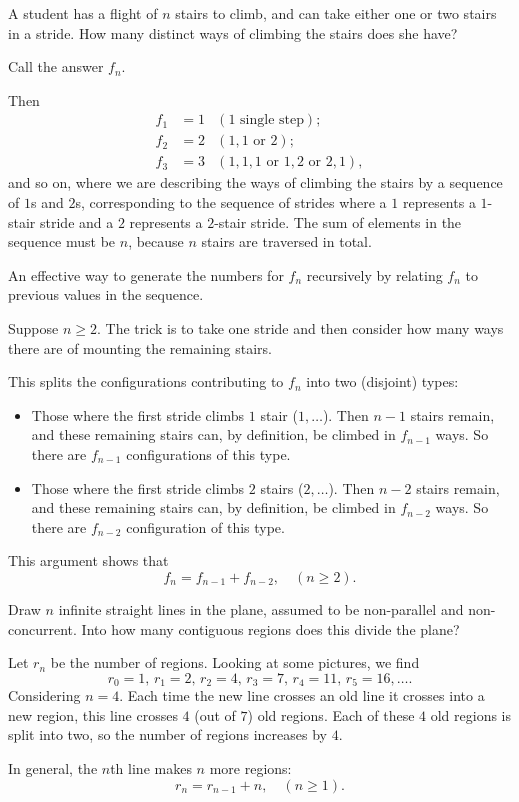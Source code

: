 \documentclass[10pt, a4paper]{article}
\begin{document}
\begin{example}[H1]
    A student has a flight of $n$ stairs to climb,
    and can take either one or two stairs in a stride.
    How many distinct ways of climbing the stairs does she have?

    Call the answer $f_n$.

    Then
    \begin{align*}
        f_1 &= 1 &(1 \text{ single step}); \\
        f_2 &= 2 &(1, 1 \text{ or } 2); \\
        f_3 &= 3 &(1, 1, 1 \text{ or } 1, 2 \text{ or } 2, 1),
    \end{align*}
    and so on,
    where we are describing the ways of climbing the stairs by a sequence of $1$s and $2$s,
    corresponding to the sequence of strides where a $1$ represents a $1$-stair stride and a $2$ represents a $2$-stair stride.
    The sum of elements in the sequence must be $n$,
    because $n$ stairs are traversed in total.

    An effective way to generate the numbers for $f_n$ recursively by relating $f_n$ to previous values in the sequence.

    Suppose $n \geq 2$.
    The trick is to take one stride and then consider how many ways there are of mounting the remaining stairs.

    This splits the configurations contributing to $f_n$ into two (disjoint) types:
    \begin{itemize}
        \item Those where the first stride climbs $1$ stair ($1, \dotsc$).
        Then $n - 1$ stairs remain,
        and these remaining stairs can, by definition,
        be climbed in $f_{n - 1}$ ways.
        So there are $f_{n - 1}$ configurations of this type.
        \item Those where the first stride climbs $2$ stairs ($2, \dotsc$).
        Then $n - 2$ stairs remain,
        and these remaining stairs can, by definition,
        be climbed in $f_{n - 2}$ ways.
        So there are $f_{n - 2}$ configuration of this type.
    \end{itemize}
    This argument shows that
    \[
    f_n = f_{n - 1} + f_{n - 2},\quad(n \geq 2).
    \]
\end{example}

\begin{example}[H2]
    Draw $n$ infinite straight lines in the plane,
    assumed to be non-parallel and non-concurrent.
    Into how many contiguous regions does this divide the plane?

    Let $r_n$ be the number of regions.
    Looking at some pictures, we find
    \[
    r_0 = 1,\,r_1 = 2,\,r_2 = 4,\,r_3 = 7,\,r_4 = 11,\,r_5 = 16,\dotsc.
    \]
    Considering $n = 4$.
    Each time the new line crosses an old line it crosses into a new region,
    this line crosses $4$ (out of $7$) old regions.
    Each of these $4$ old regions is split into two,
    so the number of regions increases by $4$.

    In general,
    the $n$th line makes $n$ more regions:
    \[
    r_n = r_{n - 1} + n,\quad(n \geq 1).
    \]

\end{example}
\end{document}
